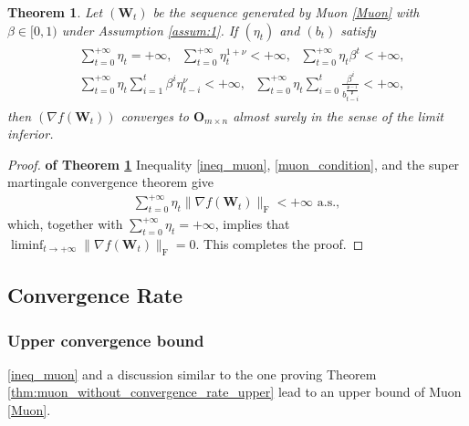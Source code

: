 \documentclass[twoside,11pt]{article}
\newtheorem{thm}{Theorem}[section]
\begin{document}
\begin{thm}\label{thm:muon_convergence}
Let $(\bm{W}_t)$ be the sequence generated by Muon \eqref{Muon} with $\beta \in [0,1)$ under Assumption \ref{assum:1}. If $(\eta_t)$ and $(b_t)$ satisfy 
\begin{align}\label{muon_condition}
\begin{split}
&\sum_{t=0}^{+\infty} \eta_t = + \infty, \text{ }
\sum_{t=0}^{+\infty} \eta_t^{1 + \nu} < + \infty, \text{ } 
\sum_{t=0}^{+\infty} \eta_t \beta^t < + \infty,\\
&\sum_{t=0}^{+\infty} \eta_t \sum_{i=1}^t \beta^i \eta_{t-i}^\nu < + \infty, \text{ } 
\sum_{t=0}^{+\infty} \eta_t \sum_{i=0}^t \frac{\beta^i}{b_{t-i}^{\frac{\mathfrak{p} -1}{\mathfrak{p}}}} < + \infty,
\end{split}
\end{align}
then $(\nabla f (\bm{W}_t))$ converges to $\bm{O}_{m \times n}$ almost surely in the sense of the limit inferior. 
\end{thm}

\begin{proof}
\textbf{of Theorem \ref{thm:muon_convergence}} Inequality \eqref{ineq_muon}, \eqref{muon_condition}, and the super martingale convergence theorem \citep[Proposition 8.2.10]{bert}  give 
\begin{align*}
\sum_{t=0}^{+ \infty} \eta_t \| \nabla f (\bm{W}_t)\|_{\mathrm{F}} < + \infty \text{ a.s.},
\end{align*}
which, together with $\sum_{t=0}^{+ \infty} \eta_t = + \infty$, implies that $\liminf_{t \to + \infty} \| \nabla f (\bm{W}_t)\|_{\mathrm{F}} = 0$. This completes the proof.
\end{proof}

\subsection{Convergence Rate}
\subsubsection{Upper convergence bound}
\eqref{ineq_muon} and a discussion similar to the one proving Theorem \ref{thm:muon_without_convergence_rate_upper} lead to an upper bound of Muon \eqref{Muon}.
\end{document}
